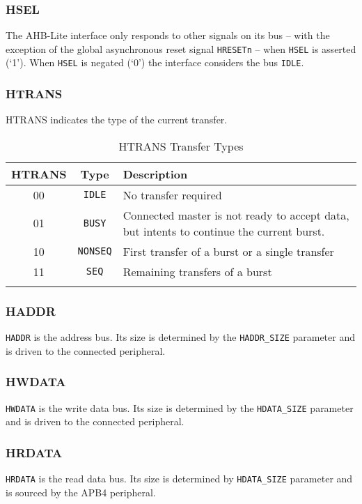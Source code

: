 \subsubsection{HSEL}

The AHB-Lite interface only responds to other signals on its bus -- with
the exception of the global asynchronous reset signal \texttt{HRESETn}
-- when \texttt{HSEL} is asserted (`1'). When \texttt{HSEL} is negated
(`0') the interface considers the bus \texttt{IDLE}.

\subsubsection{HTRANS}

HTRANS indicates the type of the current transfer.

\begin{longtable}[]{@{}ccp{7cm}@{}}
\toprule
\textbf{HTRANS} & \textbf{Type} & \textbf{Description}\tabularnewline
\midrule
\endhead
00 & \texttt{IDLE} & No transfer required\tabularnewline
01 & \texttt{BUSY} & Connected master is not ready to accept data, but intents to continue the current burst.\tabularnewline
10 & \texttt{NONSEQ} & First transfer of a burst or a single transfer\tabularnewline
11 & \texttt{SEQ} & Remaining transfers of a burst\tabularnewline
\bottomrule
\caption{HTRANS Transfer Types}
\label{table:HTRANS}
\end{longtable}

\subsubsection{HADDR}

\texttt{HADDR} is the address bus. Its size is determined by the
\texttt{HADDR\_SIZE} parameter and is driven to the connected
peripheral.

\subsubsection{HWDATA}

\texttt{HWDATA} is the write data bus. Its size is determined by the
\texttt{HDATA\_SIZE} parameter and is driven to the connected
peripheral.

\subsubsection{HRDATA}

\texttt{HRDATA} is the read data bus. Its size is determined by
\texttt{HDATA\_SIZE} parameter and is sourced by the APB4 peripheral.

